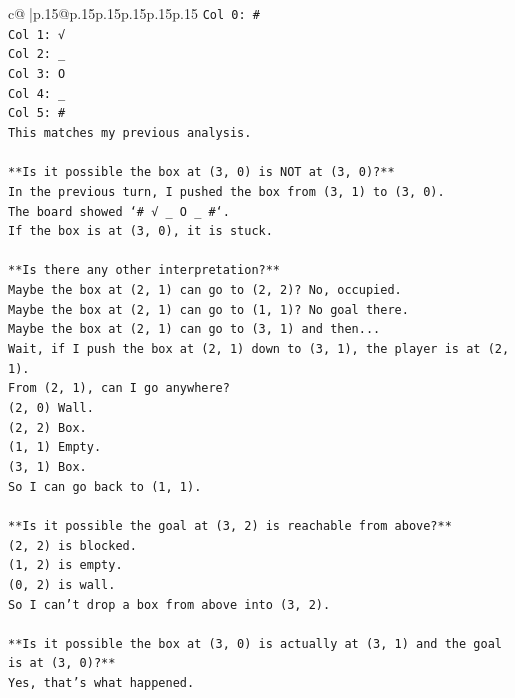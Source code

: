 \documentclass{article}
\begin{document}
{\begin{supertabular}{c@{$\;$}|p{.15\linewidth}@{}p{.15\linewidth}p{.15\linewidth}p{.15\linewidth}p{.15\linewidth}p{.15\linewidth}}
{{{\texttt{Col 0: \#} \\
\texttt{Col 1: √} \\
\texttt{Col 2: \_} \\
\texttt{Col 3: O} \\
\texttt{Col 4: \_} \\
\texttt{Col 5: \#} \\
\texttt{This matches my previous analysis.} \\
\\ 
\texttt{**Is it possible the box at (3, 0) is NOT at (3, 0)?**} \\
\texttt{In the previous turn, I pushed the box from (3, 1) to (3, 0).} \\
\texttt{The board showed `\# √ \_ O \_ \#`.} \\
\texttt{If the box is at (3, 0), it is stuck.} \\
\\ 
\texttt{**Is there any other interpretation?**} \\
\texttt{Maybe the box at (2, 1) can go to (2, 2)? No, occupied.} \\
\texttt{Maybe the box at (2, 1) can go to (1, 1)? No goal there.} \\
\texttt{Maybe the box at (2, 1) can go to (3, 1) and then...} \\
\texttt{Wait, if I push the box at (2, 1) down to (3, 1), the player is at (2, 1).} \\
\texttt{From (2, 1), can I go anywhere?} \\
\texttt{(2, 0) Wall.} \\
\texttt{(2, 2) Box.} \\
\texttt{(1, 1) Empty.} \\
\texttt{(3, 1) Box.} \\
\texttt{So I can go back to (1, 1).} \\
\\ 
\texttt{**Is it possible the goal at (3, 2) is reachable from above?**} \\
\texttt{(2, 2) is blocked.} \\
\texttt{(1, 2) is empty.} \\
\texttt{(0, 2) is wall.} \\
\texttt{So I can't drop a box from above into (3, 2).} \\
\\ 
\texttt{**Is it possible the box at (3, 0) is actually at (3, 1) and the goal is at (3, 0)?**} \\
\texttt{Yes, that's what happened.} \\
}}}
\end{supertabular}}
\end{document}
